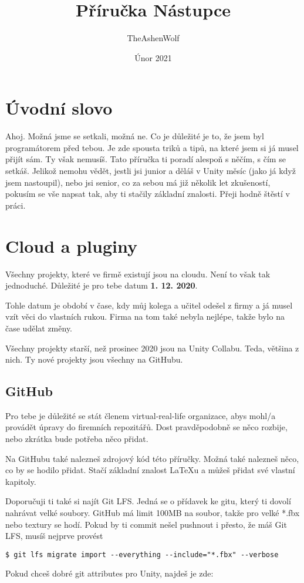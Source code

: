 \documentclass{article}
\title{Příručka Nástupce}
\author{TheAshenWolf}
\date{Únor 2021}
\begin{document}
\clearpage
\maketitle
\thispagestyle{empty}

\pagebreak

\renewcommand{\contentsname}{Obsah}
\tableofcontents

\pagebreak

\section{Úvodní slovo}
Ahoj. Možná jsme se setkali, možná ne. Co je důležité je to, že jsem byl programátorem před tebou. Je zde spousta triků a tipů, na které jsem si já musel přijít sám. Ty však nemusíš. Tato příručka ti poradí alespoň s něčím, s čím se setkáš. Jelikož nemohu vědět, jestli jsi junior a děláš v Unity měsíc (jako já když jsem nastoupil), nebo jsi senior, co za sebou má již několik let zkušeností, pokusím se vše napsat tak, aby ti stačily základní znalosti. Přeji hodně štěstí v práci.
\pagebreak

\section{Cloud a pluginy}
Všechny projekty, které ve firmě existují jsou na cloudu. Není to však tak jednoduché. Důležité je pro tebe datum \textbf{1. 12. 2020}. 

Tohle datum je období v čase, kdy můj kolega a učitel odešel z firmy a já musel vzít věci do vlastních rukou. Firma na tom také nebyla nejlépe, takže bylo na čase udělat změny.

Všechny projekty starší, než prosinec 2020 jsou na Unity Collabu. Teda, většina z nich. Ty nové projekty jsou všechny na GitHubu. 

\subsection{GitHub}
Pro tebe je důležité se stát členem virtual-real-life organizace, abys mohl/a provádět úpravy do firemních repozitářů. Dost pravděpodobně se něco rozbije, nebo zkrátka bude potřeba něco přidat.

Na GitHubu také nalezneš zdrojový kód této příručky. Možná také nalezneš něco, co by se hodilo přidat.
Stačí základní znalost LaTeXu a můžeš přidat své vlastní kapitoly.

Doporučuji ti také si najít Git LFS. Jedná se o přídavek ke gitu, který ti dovolí nahrávat velké soubory. GitHub má limit 100MB na soubor, takže pro velké *.fbx nebo textury se hodí. Pokud by ti commit nešel pushnout i přesto, že máš Git LFS, musíš nejprve provést 
\begin{lstlisting}
$ git lfs migrate import --everything --include="*.fbx" --verbose
\end{lstlisting}
Pokud chceš dobré git attributes pro Unity, najdeš je zde:
\end{document}
